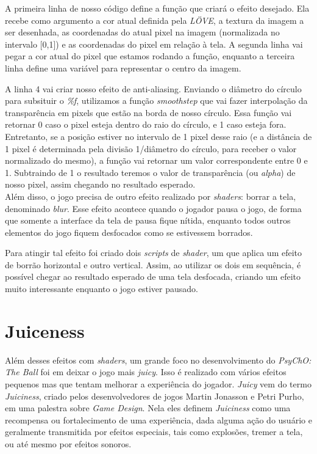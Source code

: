 A primeira linha de nosso código define a função que criará o efeito desejado. Ela recebe como argumento a cor atual definida pela \textit{LÖVE}, a textura da imagem a ser desenhada, as coordenadas do atual pixel na imagem (normalizada no intervalo [0,1]) e as coordenadas do pixel em relação à tela. A segunda linha vai pegar a cor atual do pixel que estamos rodando a função,
enquanto a terceira linha define uma variável para representar o centro da imagem.

A linha 4 vai criar nosso efeito de anti-aliasing. Enviando o diâmetro do círculo para subsituir o \textit{\%f}, utilizamos a função \textit{smoothstep} que vai fazer interpolação da transparência em pixels que estão na borda de nosso círculo. Essa função vai retornar 0 caso o pixel esteja dentro do raio do círculo, e 1 caso esteja fora. Entretanto, se a posição estiver no intervalo de 1 pixel desse raio (e a distância de 1 pixel é determinada pela divisão 1/diâmetro do círculo, para receber o valor normalizado do mesmo), a função vai retornar um valor correspondente entre 0 e 1. Subtraindo de 1 o resultado teremos o valor de transparência (ou \textit{alpha}) de nosso pixel, assim chegando no resultado esperado.\\


Além disso, o jogo precisa de outro efeito realizado por \textit{shaders}: borrar a tela, denominado \textit{blur}. Esse efeito acontece quando o jogador pausa o jogo, de forma que somente a interface da tela de pausa fique nítida, enquanto todos outros elementos do jogo fiquem desfocados como se estivessem borrados.

Para atingir tal efeito foi criado dois \textit{scripts} de \textit{shader}, um que aplica um efeito de borrão horizontal e outro vertical. Assim, ao utilizar os dois em sequência, é possível chegar ao resultado esperado de uma tela desfocada, criando um efeito muito interessante enquanto o jogo estiver pausado.


\section{Juiceness}
\label{sec:juiceness}

Além desses efeitos com \textit{shaders}, um grande foco no desenvolvimento do \textit{PsyChO: The Ball} foi em deixar o jogo mais \textit{juicy}. Isso é realizado com vários efeitos pequenos mas que tentam melhorar a experiência do jogador. \textit{Juicy} vem do termo \textit{Juiciness}, criado pelos desenvolvedores de jogos Martin Jonasson e Petri Purho, em uma palestra sobre \textit{Game Design}\cite{martinpetri}. Nela eles definem \textit{Juiciness} como uma recompensa ou fortalecimento de uma experiência, dada alguma ação do usuário e geralmente transmitida por efeitos especiais, tais como explosões, tremer a tela, ou até mesmo por efeitos sonoros.

